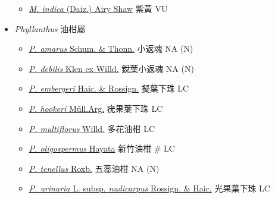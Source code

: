 \begin{itemize}
  \begin{itemize}
        \item[] \href{http://www.theplantlist.org/tpl1.1/search?q=Margaritaria+indica}{\textit{M. indica} (Daiz.) Airy Shaw}   紫黃   VU
  \end{itemize}
 \item[] \textit{Phyllanthus} 油柑屬
                                
  \begin{itemize}
        \item[] \href{http://www.theplantlist.org/tpl1.1/search?q=Phyllanthus+amarus}{\textit{P. amarus} Schum. \& Thonn.}   小返魂   NA (N)
        \item[] \href{http://www.theplantlist.org/tpl1.1/search?q=Phyllanthus+debilis}{\textit{P. debilis} Klen ex Willd.}   銳葉小返魂   NA (N)
        \item[] \href{http://www.theplantlist.org/tpl1.1/search?q=Phyllanthus+embergeri}{\textit{P. embergeri} Haic. \& Rossign.}   擬葉下珠   LC
        \item[] \href{http://www.theplantlist.org/tpl1.1/search?q=Phyllanthus+hookeri}{\textit{P. hookeri} Müll.Arg.}   疣果葉下珠   LC
        \item[] \href{http://www.theplantlist.org/tpl1.1/search?q=Phyllanthus+multiflorus}{\textit{P. multiflorus} Willd.}   多花油柑   LC
        \item[] \href{http://www.theplantlist.org/tpl1.1/search?q=Phyllanthus+oligospermus}{\textit{P. oligospermus} Hayata}   新竹油柑  \# LC
        \item[] \href{http://www.theplantlist.org/tpl1.1/search?q=Phyllanthus+tenellus}{\textit{P. tenellus} Roxb.}   五蕊油柑   NA (N)
        \item[] \href{http://www.theplantlist.org/tpl1.1/search?q=Phyllanthus+urinaria+subsp.+nudicarpus}{\textit{P. urinaria} L. subsp. \textit{nudicarpus} Rossign. \& Haic.}   光果葉下珠   LC

\end{itemize}
\end{itemize}

